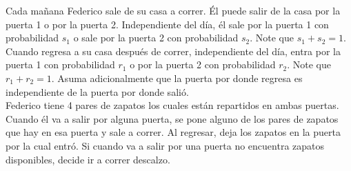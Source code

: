 
Cada mañana Federico sale de su casa a correr. Él puede salir de la casa por la puerta 1 o por la puerta 2. Independiente del día, él sale por la puerta 1 con probabilidad $s_1$ o sale por la puerta 2 con probabilidad $s_2$. Note que $s_1+s_2=1$. Cuando regresa a su casa después de correr, independiente del día, entra por la puerta 1 con probabilidad $r_1$ o por la puerta 2 con probabilidad $r_2$. Note que $r_1+r_2=1$. Asuma adicionalmente que la puerta por donde regresa es independiente de la puerta por donde salió.\\

Federico tiene 4 pares de zapatos los cuales están repartidos en ambas puertas. Cuando él va a salir por alguna puerta, se pone alguno de los pares de zapatos que hay en esa puerta y sale a correr. Al regresar, deja los zapatos en la puerta por la cual entró. Si cuando va a salir por una puerta no encuentra zapatos disponibles, decide ir a correr descalzo.

